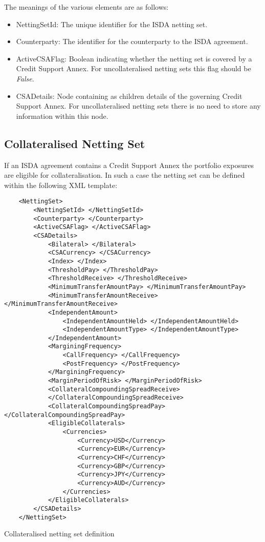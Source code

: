 The meanings of the various elements are as follows:
\begin{itemize}
\item NettingSetId: The unique identifier for the ISDA netting set.
\item Counterparty: The identifier for the counterparty to the ISDA agreement.
\item ActiveCSAFlag: Boolean indicating whether the netting set is
  covered by a Credit Support Annex. For uncollateralised netting sets
  this flag should be \emph{False}.
\item CSADetails: Node containing as children details of the governing
  Credit Support Annex. For uncollateralised netting sets there is no
  need to store any information within this node.
\end{itemize}
\subsection{Collateralised Netting Set}
If an ISDA agreement contains a Credit Support Annex the
portfolio exposures are eligible for collateralisation. In such a
case the netting set can be defined within the following XML template:

\begin{listing}[H]
\begin{verbatim}
    <NettingSet>
        <NettingSetId> </NettingSetId>
        <Counterparty> </Counterparty>
        <ActiveCSAFlag> </ActiveCSAFlag>
        <CSADetails>
            <Bilateral> </Bilateral>
            <CSACurrency> </CSACurrency>
            <Index> </Index>
            <ThresholdPay> </ThresholdPay>
            <ThresholdReceive> </ThresholdReceive>
            <MinimumTransferAmountPay> </MinimumTransferAmountPay>
            <MinimumTransferAmountReceive> </MinimumTransferAmountReceive>
            <IndependentAmount>
                <IndependentAmountHeld> </IndependentAmountHeld>
                <IndependentAmountType> </IndependentAmountType>
            </IndependentAmount>
            <MarginingFrequency>
                <CallFrequency> </CallFrequency>
                <PostFrequency> </PostFrequency>
            </MarginingFrequency>
            <MarginPeriodOfRisk> </MarginPeriodOfRisk>
            <CollateralCompoundingSpreadReceive> 
            </CollateralCompoundingSpreadReceive>
            <CollateralCompoundingSpreadPay> </CollateralCompoundingSpreadPay>
            <EligibleCollaterals>
                <Currencies>
                    <Currency>USD</Currency>
                    <Currency>EUR</Currency>
                    <Currency>CHF</Currency>
                    <Currency>GBP</Currency>
                    <Currency>JPY</Currency>
                    <Currency>AUD</Currency>
                </Currencies>
            </EligibleCollaterals>
        </CSADetails>
    </NettingSet>
\end{verbatim}
\caption{Collateralised netting set definition}
\label{lst:nettingSetCollat}
\end{listing}

